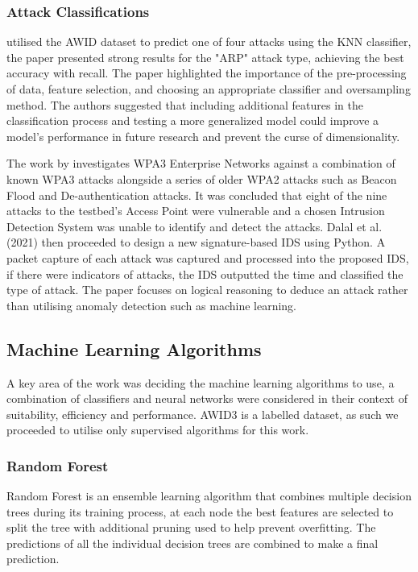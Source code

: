 \subsubsection*{Attack Classifications}

\cite{10.1007/978-3-030-98457-1_1} utilised the AWID dataset to predict one of four attacks using the KNN classifier, the paper presented strong results for the "ARP" attack type, achieving the best accuracy with recall. The paper highlighted the importance of the pre-processing of data, feature selection, and choosing an appropriate classifier and oversampling method. The authors suggested that including additional features in the classification process and testing a more generalized model could improve a model's performance in future research and prevent the curse of dimensionality.

\medskip
The work by \cite{DBLP:journals/corr/abs-2110-04259} investigates WPA3 Enterprise Networks against a combination of known WPA3 attacks alongside a series of older WPA2 attacks such as Beacon Flood and De-authentication attacks. It was concluded that eight of the nine attacks to the testbed's Access Point were vulnerable and a chosen Intrusion Detection System was unable to identify and detect the attacks. Dalal et al. (2021) then proceeded to design a new signature-based IDS using Python. A packet capture of each attack was captured and processed into the proposed IDS, if there were indicators of attacks, the IDS outputted the time and classified the type of attack. The paper focuses on logical reasoning to deduce an attack rather than utilising anomaly detection such as machine learning.
 
\subsection{Machine Learning Algorithms}

A key area of the work was deciding the machine learning algorithms to use, a combination of classifiers and neural networks were considered in their context of suitability, efficiency and performance. AWID3 is a labelled dataset, as such we proceeded to utilise only supervised algorithms for this work.

\subsubsection{Random Forest}

Random Forest is an ensemble learning algorithm that combines multiple decision trees during its training process, at each node the best features are selected to split the tree with additional pruning used to help prevent overfitting. The predictions of all the individual decision trees are combined to make a final prediction.

